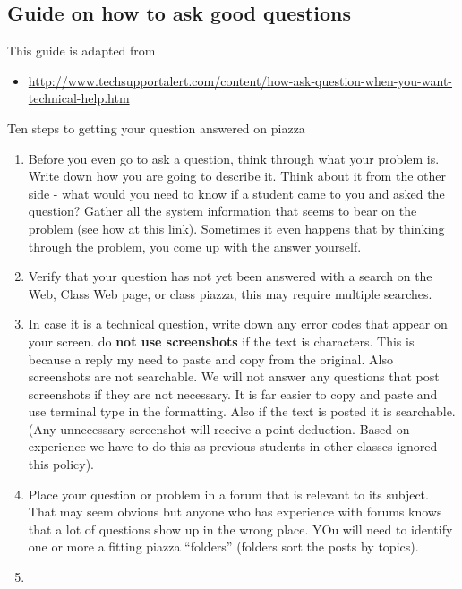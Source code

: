 \subsection{Guide on how to ask good
questions}\label{guide-on-how-to-ask-good-questions}

This guide is adapted from

\begin{itemize}
\tightlist
\item
  \url{http://www.techsupportalert.com/content/how-ask-question-when-you-want-technical-help.htm}
\end{itemize}

Ten steps to getting your question answered on piazza

\begin{enumerate}
\def\labelenumi{\arabic{enumi}.}
\tightlist
\item
  Before you even go to ask a question, think through what your problem
  is. Write down how you are going to describe it. Think about it from
  the other side - what would you need to know if a student came to you
  and asked the question? Gather all the system information that seems
  to bear on the problem (see how at this link). Sometimes it even
  happens that by thinking through the problem, you come up with the
  answer yourself.
\item
  Verify that your question has not yet been answered with a search on
  the Web, Class Web page, or class piazza, this may require multiple
  searches.
\item
  In case it is a technical question, write down any error codes that
  appear on your screen. do \textbf{not use screenshots} if the text is
  characters. This is because a reply my need to paste and copy from the
  original. Also screenshots are not searchable. We will not answer any
  questions that post screenshots if they are not necessary. It is far
  easier to copy and paste and use terminal type in the formatting. Also
  if the text is posted it is searchable. (Any unnecessary screenshot
  will receive a point deduction. Based on experience we have to do this
  as previous students in other classes ignored this policy).
\item
  Place your question or problem in a forum that is relevant to its
  subject. That may seem obvious but anyone who has experience with
  forums knows that a lot of questions show up in the wrong place. YOu
  will need to identify one or more a fitting piazza ``folders''
  (folders sort the posts by topics).
\item

\end{enumerate}
